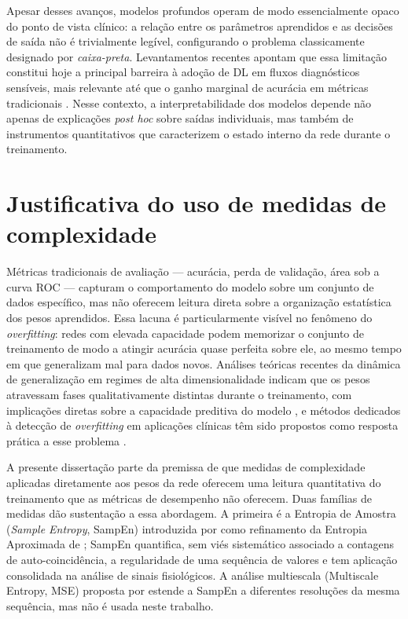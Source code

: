 Apesar desses avanços, modelos profundos operam de modo essencialmente
opaco do ponto de vista clínico: a relação entre os parâmetros aprendidos
e as decisões de saída não é trivialmente legível, configurando o problema
classicamente designado por \emph{caixa-preta}. Levantamentos recentes
apontam que essa limitação constitui hoje a principal barreira à adoção
de DL em fluxos diagnósticos sensíveis, mais relevante até que o ganho
marginal de acurácia em métricas tradicionais \cite{teng2022}. Nesse
contexto, a interpretabilidade dos modelos depende não apenas de explicações
\emph{post hoc} sobre saídas individuais, mas também de instrumentos
quantitativos que caracterizem o estado interno da rede durante o
treinamento.

\section{Justificativa do uso de medidas de complexidade}
\label{sec:intro-justificativa}

Métricas tradicionais de avaliação --- acurácia, perda de validação,
área sob a curva ROC --- capturam o comportamento do modelo sobre um
conjunto de dados específico, mas não oferecem leitura direta sobre a
organização estatística dos pesos aprendidos. Essa lacuna é particularmente
visível no fenômeno do \emph{overfitting}: redes com elevada capacidade
podem memorizar o conjunto de treinamento de modo a atingir acurácia
quase perfeita sobre ele, ao mesmo tempo em que generalizam mal para
dados novos. Análises teóricas recentes da dinâmica de generalização em
regimes de alta dimensionalidade indicam que os pesos atravessam fases
qualitativamente distintas durante o treinamento, com implicações diretas
sobre a capacidade preditiva do modelo \cite{advani2020}, e métodos
dedicados à detecção de \emph{overfitting} em aplicações clínicas têm
sido propostos como resposta prática a esse problema \cite{zhang2025}.

A presente dissertação parte da premissa de que medidas de complexidade
aplicadas diretamente aos pesos da rede oferecem uma leitura quantitativa
do treinamento que as métricas de desempenho não oferecem. Duas
famílias de medidas dão sustentação a essa abordagem. A primeira é a
Entropia de Amostra (\emph{Sample Entropy}, SampEn) introduzida por
 como refinamento da Entropia Aproximada de
; SampEn quantifica, sem viés sistemático associado a
contagens de auto-coincidência, a regularidade de uma sequência de valores
e tem aplicação consolidada na análise de sinais fisiológicos.
A análise multiescala (Multiscale Entropy, MSE) proposta por
 estende a SampEn a diferentes resoluções da mesma
sequência, mas não é usada neste trabalho.

